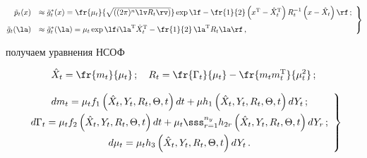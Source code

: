   \begin{equation}

   \hspace*{-2mm}\left.

   \begin{array}{rl}

    \tilde p_t (x) &\approx \tilde g_t^* (x) =\fr{\mu_t}

    {\sqrt{((2\pi)^n \lv R_t\rv)}} \exp\lf -\fr{1}{2} \left(x^{\mathrm{T}} -\hat X_t^{\mathrm{T}}\right)

    R_t^{-1} \left(x-\hat X_t\right)\rf\,;

\\[9pt]

    \tilde g_t (\la) &\approx \tilde g_t^* (\la) =\mu_t \exp\lf i\la^{\mathrm{T}}

    \hat X_t^{\mathrm{T}}-\fr{1}{2}\,\la^{\mathrm{T}} R_t\la\rf\,,

    \end{array}

    \right\}\!\!

    \label{e3.6-s1}

    \end{equation}

получаем уравнения НСОФ

   \begin{equation}

   \hat X_t= \fr{m_t}{\mu_t}\,;\quad R_t= \fr{\Gamma_t}{\mu_t} - 

   \fr{m_tm_t^{\mathrm{T}}}{\mu_t^2}\,;\label{e3.7-s1}

   \end{equation}

   \begin{equation}

   \left.

   \begin{array}{c}

dm_t=

    \mu_t f_1 \left(\hat X_t,Y_t, R_t,\Theta,  t \right) dt +

    \mu h_1 \left(\hat X_t,Y_t, R_t, \Theta,t \right)dY_t\,; 

    \\[6pt]

d \Gamma_t =\mu_t f_2 \left(\hat X_t,Y_t, R_t,\Theta,  t \right)dt+ 

\displaystyle \mu_t \sss_{r=1}^{n_y} h_{2r}

    \left(\hat X_t, Y_t,R_t, \Theta, t \right) dY_r\,; %

    \\[6pt]

d\mu_t = \mu_t h_3 \left(\hat X_t, Y_t,R_t,\Theta,  t \right) dY_t\,.%

\end{array}

\right\}

\label{e3.8-s1}

\end{equation}

